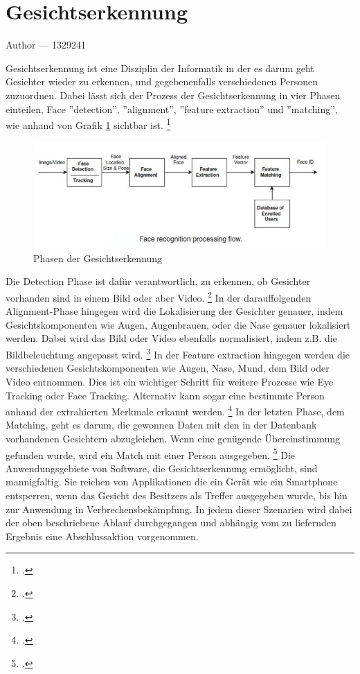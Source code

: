 \documentclass[12pt, a4paper]{report}
\makeatletter
\newcommand*\setcaptioncitation[1]{\def\captioncitation{\textit{Quelle:}~#1}}
\let\captioncitation\relax
\newcommand{\sectionauthor}[1]{%
  {\parindent0pt\vspace*{-5pt}%
  \large{Author --- }
  \linespread{1.1}\large\scshape#1%
  \par\nobreak\vspace*{35pt} }
  \@afterheading%
}
\makeatother
\begin{document}
\section{Gesichtserkennung}
\sectionauthor{1329241}
Gesichtserkennung ist eine Disziplin der Informatik in der es darum geht Gesichter wieder zu erkennen, und gegebenenfalls verschiedenen Personen zuzuordnen. Dabei lässt sich der Prozess der Gesichtserkennung in vier Phasen einteilen, Face ''detection'', ''alignment'', ''feature extraction'' und ''matching'', wie anhand von Grafik \ref{fig:Face Recognition} sichtbar ist.
\footcite[Vgl. ][2]{HandbookFaceRec}
\begin{figure}[h]
\includegraphics[width=\linewidth]{Bilder/FaceRecognition.png}
\setcaptioncitation{ https://alitarhini.files.wordpress.com/2010/12/untitled1.png}
\caption{ Phasen der Gesichtserkennung}
\label{fig:Face Recognition}
\end{figure}
Die Detection Phase ist dafür verantwortlich, zu erkennen, ob Gesichter vorhanden sind in einem Bild oder aber Video.
\footcite[Vgl. ][2]{HandbookFaceRec}
In der darauffolgenden Alignment-Phase hingegen wird die Lokalisierung der Gesichter genauer, indem Gesichtskomponenten wie Augen, Augenbrauen, oder die Nase genauer lokalisiert werden. Dabei wird das Bild oder Video ebenfalls normalisiert, indem z.B. die Bildbeleuchtung angepasst wird.
\footcite[Vgl. ][2]{HandbookFaceRec}
In der Feature extraction hingegen werden die verschiedenen Gesichtskomponenten wie Augen, Nase, Mund, dem Bild oder Video entnommen. Dies ist ein wichtiger Schritt für weitere Prozesse wie Eye Tracking oder Face Tracking. Alternativ kann sogar eine bestimmte Person anhand der extrahierten Merkmale erkannt werden.
\footcite[Vgl. ][Abstract]{IEEE}
In der letzten Phase, dem Matching, geht es darum, die gewonnen Daten mit den in der Datenbank vorhandenen Gesichtern abzugleichen. Wenn eine genügende Übereinstimmung gefunden wurde, wird ein Match mit einer Person ausgegeben.
\footcite[Vgl. ][3]{HandbookFaceRec}
Die Anwendungsgebiete von Software, die Gesichtserkennung ermöglicht, sind mannigfaltig. Sie reichen von Applikationen die ein Gerät wie ein Smartphone entsperren, wenn das Gesicht des Besitzers als Treffer ausgegeben wurde, bis hin zur Anwendung in Verbrechensbekämpfung. In jedem dieser Szenarien wird dabei der oben beschriebene Ablauf durchgegangen und abhängig vom zu liefernden Ergebnis eine Abschlussaktion vorgenommen.
\end{document}
